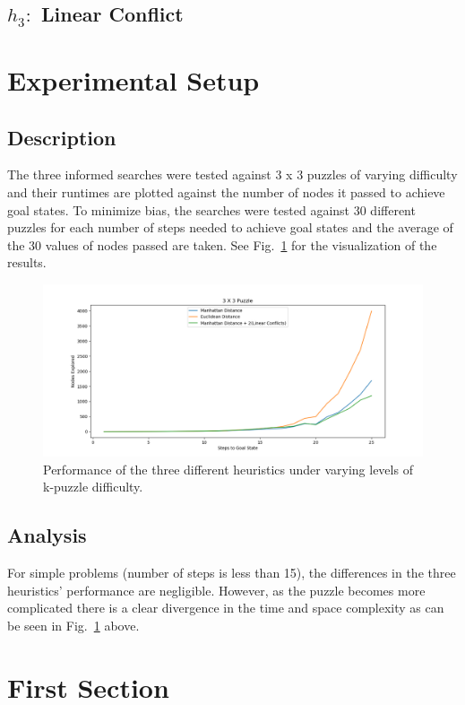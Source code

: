 \documentclass[runningheads]{llncs}
\begin{document}
\subsection{ \(h_3: \) Linear Conflict}

\section{Experimental Setup}
\subsection{Description}
The three informed searches were tested against 3 x 3 puzzles of varying difficulty and their runtimes are plotted against the number of nodes it passed to achieve goal states. To minimize bias, the searches were tested against 30 different puzzles for each number of steps needed to achieve goal states and the average of the 30 values of nodes passed are taken. See
Fig.~\ref{fig1} for the visualization of the results.

\begin{figure}
    \includegraphics[width=\textwidth]{fig1.png}
    \caption{Performance of the three different heuristics under varying levels of k-puzzle difficulty.} \label{fig1}
    \end{figure}

\subsection{Analysis}
For simple problems (number of steps is less than 15), the differences in the three heuristics' performance are negligible. However, as the puzzle becomes more complicated there is a clear divergence in the time and space complexity as can be seen in Fig.~\ref{fig1} above.

\section{First Section}
\end{document}
